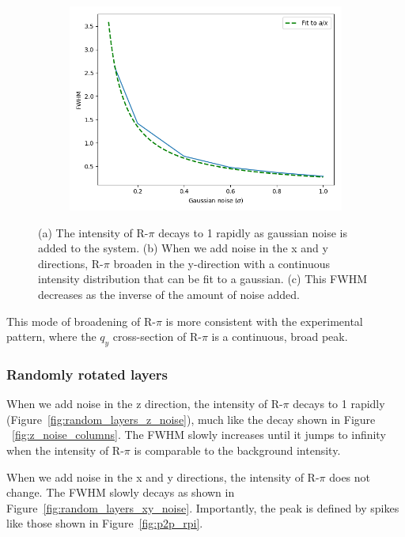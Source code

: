 \documentclass{article}
\begin{document}
\begin{figure}[!htb]
\begin{subfigure}{0.32\textwidth}
  \includegraphics[width=\textwidth]{random_columns_xy_noise.png}
  \caption{}\label{fig:FWHM_columns}
  \end{subfigure}
  \caption{(a) The intensity of R-$\pi$ decays to 1 rapidly as gaussian noise is 
   added to the system. (b) When we add noise in the x and y directions, R-$\pi$
   broaden in the y-direction with a continuous intensity distribution that can be
   fit to a gaussian. (c) This FWHM decreases as the inverse of the amount of 
   noise added.}\label{fig:columns_noise}
  \end{figure}

  This mode of broadening of R-$\pi$ is more consistent with the experimental
  pattern, where the $q_y$ cross-section of R-$\pi$ is a continuous, broad peak. 

  \subsubsection{Randomly rotated layers}

  When we add noise in the z direction, the intensity of R-$\pi$ decays to 1
  rapidly (Figure~\ref{fig:random_layers_z_noise}), much like the decay shown in
  Figure ~\ref{fig:z_noise_columns}. The FWHM slowly increases until it jumps to
  infinity when the intensity of R-$\pi$ is comparable to the background
  intensity.

  When we add noise in the x and y directions, the intensity of R-$\pi$ does
  not change. The FWHM slowly decays as shown in
  Figure~\ref{fig:random_layers_xy_noise}. Importantly, the peak is defined by
  spikes like those shown in Figure~\ref{fig:p2p_rpi}.
\end{document}

